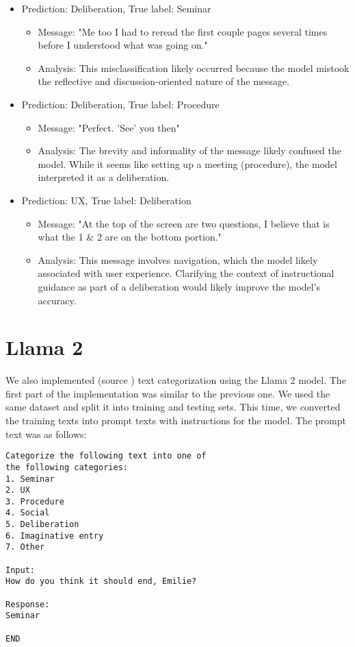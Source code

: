 \documentclass[fleqn,moreauthors,10pt]{ds_report}
\begin{document}
\begin{itemize}
    \item Prediction: Deliberation, True label: Seminar
    \begin{itemize}
        \item Message: "Me too I had to reread the first couple pages several times before I understood what was going on."
        \item Analysis: This misclassification likely occurred because the model mistook the reflective and dis\-cussion-oriented nature of the message.
    \end{itemize}
    \item Prediction: Deliberation, True label: Procedure
    \begin{itemize}
        \item Message: "Perfect. 'See' you then"
        \item Analysis: The brevity and informality of the message likely confused the model. While it seems like setting up a meeting (procedure), 
        the model interpreted it as a deliberation.
    \end{itemize}
    \item Prediction: UX, True label: Deliberation
    \begin{itemize}
        \item Message: "At the top of the screen are two questions, I believe that is what the 1 \& 2 are on the bottom portion."
        \item Analysis: This message involves navigation, which the model likely associated with user experience. Clarifying the 
        context of instructional guidance as part of a deliberation would likely improve the model's accuracy.
    \end{itemize}
\end{itemize}


\section*{Llama 2}

We also implemented (source \cite{Sahay2023}) text categorization using the Llama 2 model. The first part of the implementation was similar to the previous one. We used the same dataset and split it into training and testing sets. This time, we converted the training texts into prompt texts with instructions for the model. The prompt text was as follows:

\begin{verbatim}
Categorize the following text into one of 
the following categories:
1. Seminar
2. UX
3. Procedure
4. Social
5. Deliberation
6. Imaginative entry
7. Other 

Input:
How do you think it should end, Emilie?

Response:
Seminar

END
\end{verbatim}
\end{document}
